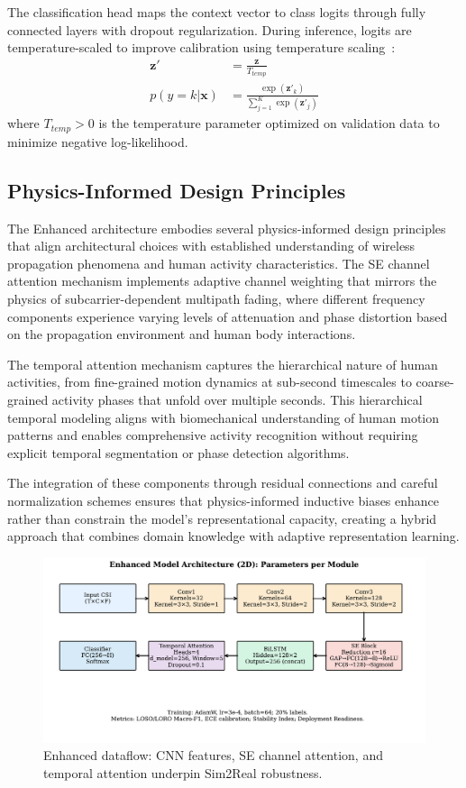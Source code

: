 \documentclass[journal]{IEEEtran}
\begin{document}
The classification head maps the context vector to class logits through fully connected layers with dropout regularization. During inference, logits are temperature-scaled to improve calibration using temperature scaling~\cite{calibration_guo2017}:
\begin{align}
\mathbf{z}' &= \frac{\mathbf{z}}{T_{temp}} \\
p(y = k | \mathbf{x}) &= \frac{\exp(\mathbf{z}'_k)}{\sum_{j=1}^{K} \exp(\mathbf{z}'_j)}
\end{align}
where $T_{temp} > 0$ is the temperature parameter optimized on validation data to minimize negative log-likelihood.

\subsection{Physics-Informed Design Principles}

The Enhanced architecture embodies several physics-informed design principles that align architectural choices with established understanding of wireless propagation phenomena and human activity characteristics. The SE channel attention mechanism implements adaptive channel weighting that mirrors the physics of subcarrier-dependent multipath fading, where different frequency components experience varying levels of attenuation and phase distortion based on the propagation environment and human body interactions.

The temporal attention mechanism captures the hierarchical nature of human activities, from fine-grained motion dynamics at sub-second timescales to coarse-grained activity phases that unfold over multiple seconds. This hierarchical temporal modeling aligns with biomechanical understanding of human motion patterns and enables comprehensive activity recognition without requiring explicit temporal segmentation or phase detection algorithms.

The integration of these components through residual connections and careful normalization schemes ensures that physics-informed inductive biases enhance rather than constrain the model's representational capacity, creating a hybrid approach that combines domain knowledge with adaptive representation learning.

\begin{figure}[t]
\centering
\includegraphics[width=\columnwidth]{figures/fig3_enhanced_model_dataflow.pdf}
\caption{Enhanced dataflow: CNN features, SE channel attention, and temporal attention underpin Sim2Real robustness.}
\label{fig:enhanced}
\end{figure}
\end{document}
